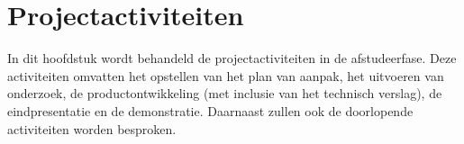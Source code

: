 \chapter{Projectactiviteiten}
In dit hoofdstuk wordt behandeld de projectactiviteiten in de afstudeerfase.
Deze activiteiten omvatten het opstellen van het plan van aanpak, het uitvoeren van onderzoek, de productontwikkeling (met inclusie van het technisch verslag), de eindpresentatie en de demonstratie.
Daarnaast zullen ook de doorlopende activiteiten worden besproken.





